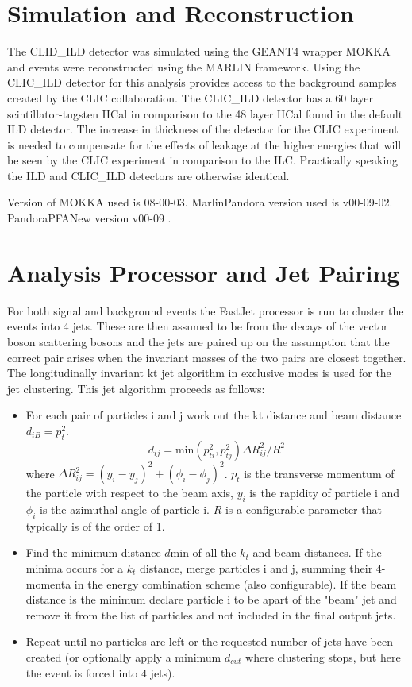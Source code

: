 \section{Simulation and Reconstruction}

The CLID\_ILD detector \cite{arXiv:1006.3396} was simulated using the GEANT4 wrapper MOKKA and events were reconstructed using the MARLIN framework. Using the CLIC\_ILD detector for this analysis provides access to the background samples created by the CLIC collaboration. The CLIC\_ILD detector has a 60 layer scintillator-tugsten HCal in comparison to the 48 layer HCal found in the default ILD detector. The increase in thickness of the detector for the CLIC experiment is needed to compensate for the effects of leakage at the higher energies that will be seen by the CLIC experiment in comparison to the ILC. Practically speaking the ILD and CLIC\_ILD detectors are otherwise identical.

Version of MOKKA used is 08-00-03. MarlinPandora version used is v00-09-02. PandoraPFANew version v00-09 \cite{arXiv:0907.3577, arXiv:1209.4039}.

\section{Analysis Processor and Jet Pairing}

For both signal and background events the FastJet processor is run to cluster the events into 4 jets. These are then assumed to be from the decays of the vector boson scattering bosons and the jets are paired up on the assumption that the correct pair arises when the invariant masses of the two pairs are closest together. The longitudinally invariant kt jet algorithm in exclusive modes is used for the jet clustering.
This jet algorithm proceeds as follows:

\begin{itemize}
\item For each pair of particles i and j work out the kt distance and beam distance $d_{iB} = p_{t}^{2}$.
\begin{equation}
d_{ij} = \text{min}(p_{ti}^{2}, p_{tj}^{2}){\Delta}R^{2}_{ij}/R^{2}
\end{equation}
where ${\Delta}R^{2}_{ij} = (y_{i} - y_{j})^2 + (\phi_{i} - \phi_{j})^2$.  $p_{t}$ is the transverse momentum of the particle with respect to the beam axis, $y_{i}$ is the rapidity of particle i and $\phi_{i}$ is the azimuthal angle of particle i. $R$ is a configurable parameter that typically is of the order of 1.
\item Find the minimum distance $d\text{min}$ of all the $k_{t}$ and beam distances. If the minima occurs for a $k_{t}$ distance, merge particles i and j, summing their 4-momenta in the energy combination scheme (also configurable). If the beam distance is the minimum declare particle i to be apart of the "beam" jet and remove it from the list of particles and not included in the final output jets.
\item Repeat until no particles are left or the requested number of jets have been created (or optionally apply a minimum $d_{cut}$ where clustering stops, but here the event is forced into 4 jets).
\end{itemize}

